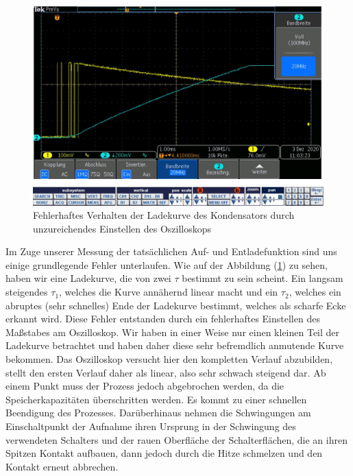 \documentclass{article}
\begin{document}
\begin{figure}[h!]
  \begin{center}
    \includegraphics[scale=0.45]{../assets/images/ET2P4/aufgabe3Fehler.JPG}
    \caption{Fehlerhaftes Verhalten der Ladekurve des Kondensators durch unzureichendes Einstellen des Oszilloskops}
    \label{fig:error}
  \end{center}
\end{figure}

Im Zuge unserer Messung der tatsächlichen Auf- und Entladefunktion sind uns einige grundlegende Fehler unterlaufen. Wie auf der Abbildung (\ref{fig:error}) zu 
sehen, haben wir eine Ladekurve, die von zwei $\tau$ bestimmt zu sein scheint. Ein langsam steigendes $\tau_1$, welches die Kurve annähernd linear macht und ein 
$\tau_2$, welches ein abruptes (sehr schnelles) Ende der Ladekurve bestimmt, welches als scharfe Ecke erkannt wird. Diese Fehler entstanden durch ein fehlerhaftes Einstellen des Maßstabes am
Oszilloskop. Wir haben in einer Weise nur einen kleinen Teil der Ladekurve betrachtet und haben daher diese sehr befremdlich anmutende Kurve bekommen. Das Oszilloskop versucht hier den 
kompletten Verlauf abzubilden, stellt den ersten Verlauf daher als linear, also sehr schwach steigend dar. Ab einem Punkt muss der Prozess jedoch abgebrochen werden, da die Speicherkapazitäten überschritten werden.
Es kommt zu einer schnellen Beendigung des Prozesses.
Darüberhinaus nehmen die Schwingungen am Einschaltpunkt der Aufnahme ihren Ursprung in der Schwingung des verwendeten Schalters und der rauen Oberfläche der Schalterflächen, die an ihren Spitzen Kontakt aufbauen, dann jedoch
durch die Hitze schmelzen und den Kontakt erneut abbrechen.
\end{document}
